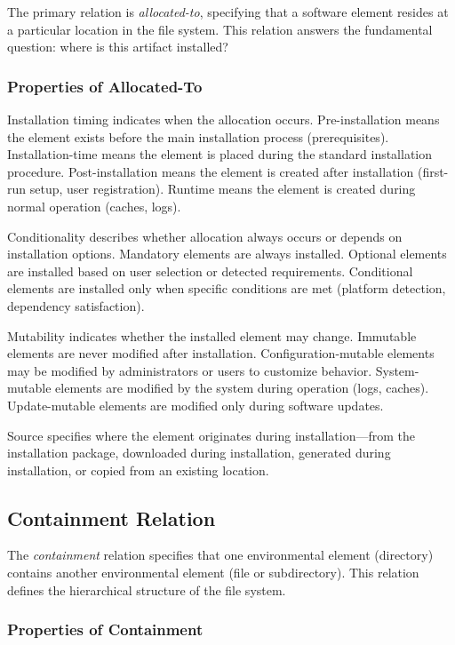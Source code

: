 \documentclass[11pt]{article}
\begin{document}
The primary relation is \textit{allocated-to}, specifying that a software element resides at a particular location in the file system. This relation answers the fundamental question: where is this artifact installed?

\subsubsection{Properties of Allocated-To}

Installation timing indicates when the allocation occurs. Pre-installation means the element exists before the main installation process (prerequisites). Installation-time means the element is placed during the standard installation procedure. Post-installation means the element is created after installation (first-run setup, user registration). Runtime means the element is created during normal operation (caches, logs).

Conditionality describes whether allocation always occurs or depends on installation options. Mandatory elements are always installed. Optional elements are installed based on user selection or detected requirements. Conditional elements are installed only when specific conditions are met (platform detection, dependency satisfaction).

Mutability indicates whether the installed element may change. Immutable elements are never modified after installation. Configuration-mutable elements may be modified by administrators or users to customize behavior. System-mutable elements are modified by the system during operation (logs, caches). Update-mutable elements are modified only during software updates.

Source specifies where the element originates during installation---from the installation package, downloaded during installation, generated during installation, or copied from an existing location.

\subsection{Containment Relation}

The \textit{containment} relation specifies that one environmental element (directory) contains another environmental element (file or subdirectory). This relation defines the hierarchical structure of the file system.

\subsubsection{Properties of Containment}
\end{document}
